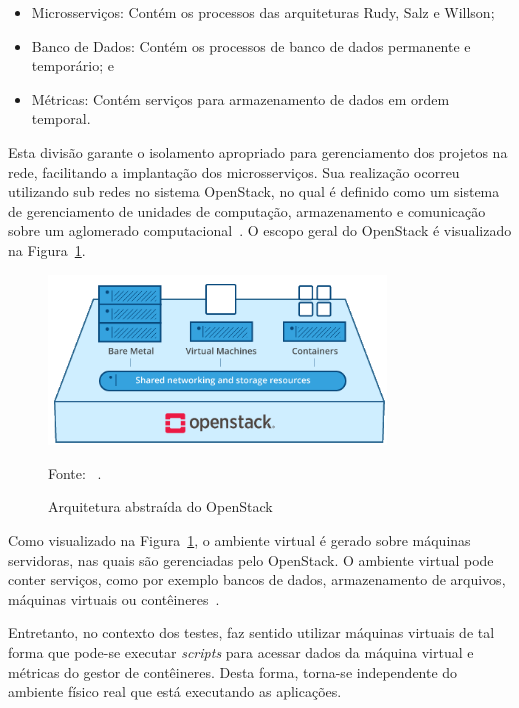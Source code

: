 \begin{itemize}
  \item Microsserviços: Contém os processos das arquiteturas Rudy, Salz e Willson;
  \item Banco de Dados: Contém os processos de banco de dados permanente e temporário; e
  \item Métricas: Contém serviços para armazenamento de dados em ordem temporal.
\end{itemize}



Esta divisão garante o isolamento apropriado para gerenciamento dos projetos na rede, facilitando a implantação dos microsserviços.
%
Sua realização ocorreu utilizando sub redes no sistema OpenStack, no qual é definido como um sistema de gerenciamento de unidades de computação, armazenamento e comunicação sobre um aglomerado computacional~\cite{open_stack_bib}.
%
O escopo geral do OpenStack é visualizado na Figura~\ref{fig:arch_open_stack}.



\begin{figure}[htb!]
  \caption{Arquitetura abstraída do OpenStack}
  \label{fig:arch_open_stack}
  \includegraphics[width=0.8\textwidth]{figuras/ambiente/openstack.png}
  \centering

  Fonte: ~\cite{open_stack_bib}.
\end{figure}



Como visualizado na Figura~\ref{fig:arch_open_stack}, o ambiente virtual é gerado sobre máquinas servidoras, nas quais são gerenciadas pelo OpenStack.
%
O ambiente virtual pode conter serviços, como por exemplo bancos de dados, armazenamento de arquivos, máquinas virtuais ou contêineres~\cite{open_stack_bib}.



Entretanto, no contexto dos testes, faz sentido utilizar máquinas virtuais de tal forma que pode-se executar \textit{scripts} para acessar dados da máquina virtual e métricas do gestor de contêineres.
%
Desta forma, torna-se independente do ambiente físico real que está executando as aplicações.




